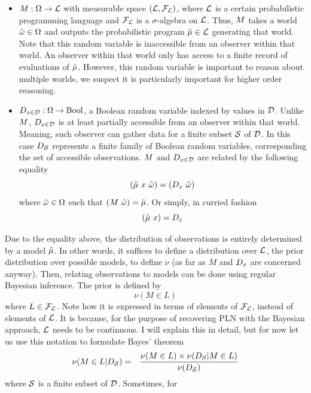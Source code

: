 \documentclass[]{article}
\begin{document}
\begin{itemize}
\item $M : \Omega \to \mathcal{L}$ with measurable space
  $(\mathcal{L}, \mathcal{F}_{\mathcal{L}})$, where $\mathcal{L}$ is a certain
  probabilistic programming language and $\mathcal{F}_{\mathcal{L}}$ is a
  $\sigma$-algebra on $\mathcal{L}$.  Thus, $M$ takes a world
  $\hat{\omega} \in \Omega$ and outputs the probabilistic program $\hat{\mu}
  \in \mathcal{L}$ generating that world.  Note that this random
  variable is inaccessible from an observer within that world.  An
  observer within that world only has access to a finite record of
  evaluations of $\hat{\mu}$.  However, this random variable is important
  to reason about multiple worlds, we suspect it is particularly
  important for higher order reasoning.
\item $D_{x\in\mathcal{D}} : \Omega \to \textup{Bool}$, a Boolean random variable indexed
  by values in $\mathcal{D}$.  Unlike $M$, $D_{x\in\mathcal{D}}$ is at least
  partially accessible from an observer within that world.  Meaning,
  such observer can gather data for a finite subset $\mathcal{S}$ of
  $\mathcal{D}$.  In this case $D_{\mathcal{S}}$ represents a finite family of
  Boolean random variables, corresponding the set of accessible
  observations.  $M$ and $D_{x\in\mathcal{D}}$ are related by the following
  equality
  $$(\anymu\ x\ \anyomega) = (\Datax\ \anyomega)$$ where $\hat{\omega}
  \in \Omega$ such that $(M\ \hat{\omega}) = \hat{\mu}$.  Or simply, in
  curried fashion
  $$(\hat{\mu}\ x) = D_{x}$$
\end{itemize}
Due to the equality above, the distribution of observations is
entirely determined by a model $\hat{\mu}$.  In other words, it suffices
to define a distribution over $\mathcal{L}$, the prior distribution over
possible models, to define $\nu$ (as far as $M$ and $D_{x}$ are
concerned anyway).  Then, relating observations to models can be done
using regular Bayesian inference.  The prior is defined by
$$\nu(M \in L)$$ where $L \in \mathcal{F}_{\mathcal{L}}$.  Note how it is
expressed in terms of elements of $\mathcal{F}_{\mathcal{L}}$, instead of
elements of $\mathcal{L}$.  It is because, for the purpose of recovering
PLN with the Bayesian approach, $\mathcal{L}$ needs to be continuous.  I
will explain this in detail, but for now let us use this notation to
formulate Bayes' theorem
\begin{eqnarray}
  \nu(M \in L | D_{\mathcal{S}})
  & = &
  \frac{\nu(M \in L) \times \nu(D_{\mathcal{S}} | M \in L)}{\nu(D_{\mathcal{S}})}
  \label{eq:globaldist}
\end{eqnarray}
where $\mathcal{S}$ is a finite subset of $\mathcal{D}$.  Sometimes, for
\end{document}
